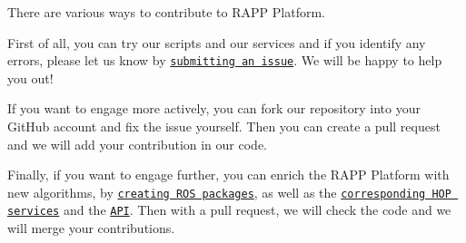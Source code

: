 There are various ways to contribute to R\-A\-P\-P Platform.


\begin{DoxyItemize}
\item First of all, you can try our scripts and our services and if you identify any errors, please let us know by \href{https://github.com/rapp-project/rapp-platform/issues}{\tt submitting an issue}. We will be happy to help you out!
\item If you want to engage more actively, you can fork our repository into your Git\-Hub account and fix the issue yourself. Then you can create a pull request and we will add your contribution in our code.
\item Finally, if you want to engage further, you can enrich the R\-A\-P\-P Platform with new algorithms, by \href{https://github.com/rapp-project/rapp-platform/wiki/How-to-create-a-new-RAPP-Platform-ROS-node%3F}{\tt creating R\-O\-S packages}, as well as the \href{https://github.com/rapp-project/rapp-platform/wiki/How-to-create-a-HOP-service-for-a-ROS-service%3F}{\tt corresponding H\-O\-P services} and the \href{https://github.com/rapp-project/rapp-platform/wiki/How-to-write-the-API-for-a-HOP-service%3F}{\tt A\-P\-I}. Then with a pull request, we will check the code and we will merge your contributions. 
\end{DoxyItemize}